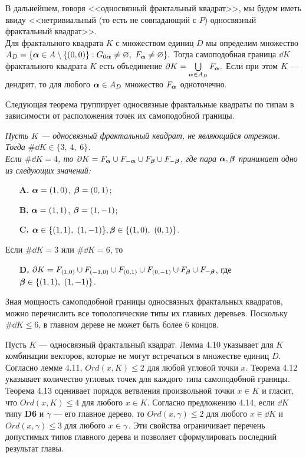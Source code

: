 \documentclass[a5paper,9pt,twoside]{extarticle} %
\begin{document}
В дальнейшем, говоря <<односвязный фрактальный квадрат>>, мы будем иметь ввиду <<нетривиальный (то есть не совпадающий с $P$) односвязный фрактальный квадрат>>.\\

Для фрактального квадрата $K$ с множеством единиц $D$ мы определим множество
$A_D=\{{\bm{\alpha}}\in A\setminus\{(0,0)\}: G_{0{\bm{\alpha}}}\neq\varnothing,\ F_{\bm{\alpha}}\neq\varnothing\}.$
Тогда самоподобная граница $\dd K$ фрактального квадрата $K$ есть объединение
$\partial K=\bigcup\limits_{{\bm{\alpha}}\in A_D}F_{\bm{\alpha}}.$
Если при этом $K$ --- дендрит, то для любого ${\bm{\alpha}}\in A_D$ множество $F_{\bm{\alpha}}$ одноточечно.

Следующая теорема группирует односвязные фрактальные квадраты по типам в зависимости от расположения точек их самоподобной границы.\\

{\em Пусть $K$ --- односвязный фрактальный квадрат, не являющийся отрезком.
Тогда $\#\dd K\in\{3,\ 4,\ 6\}$. \\
Если $\#\dd K=4$, то $\partial K=F_{\bm{\alpha}}\cup F_{-{\bm{\alpha}}}\cup F_{\bm{\beta}}\cup F_{-{\bm{\beta}}}$, где пара ${\bm{\alpha}},{\bm{\beta}}$ принимает одно из следующих значений:
\begin{itemize}[nolistsep]
\item[{\bf A.}] ${\bm{\alpha}}=(1,0)$, $ {\bm{\beta}}=(0,1)$;
\item[{\bf B.}] ${\bm{\alpha}}=(1,1)$, $ {\bm{\beta}}=(1,-1)$;
\item[{\bf C.}] $\bma\in\{(1,1),\ (1,-1)\},\bmb\in\{(1,0),\ (0,1)\}$.
\end{itemize}
Если $\#\dd K=3$ или $\#\dd K=6$, то
\begin{itemize}[nolistsep]
\item[{\bf D.}] $\partial K=F_{(1,0)}\cup F_{(-1,0)}\cup F_{(0,1)}\cup F_{(0,-1)}\cup F_{\bm{\beta}}\cup F_{-{\bm{\beta}}}$, где ${\bm{\beta}}\in\{(1,1),\ (1,-1)\}$.
\end{itemize}}

Зная мощность самоподобной границы односвязных фрактальных квадратов, можно перечислить все топологические типы их главных деревьев.
Поскольку $\#\dd K\leq6$, в главном дереве не может быть более 6 концов.

Пусть $K$ --- односвязный фрактальный квадрат.
Лемма 4.10 указывает для $K$ комбинации векторов, которые не могут встречаться в множестве единиц $D$.
Согласно лемме 4.11, $Ord(x,K)\leq 2$ для любой угловой точки $x$.
Теорема 4.12 указывает количество угловых точек для каждого типа самоподобной границы.
Теорема 4.13 оценивает порядок ветвления произвольной точки $x\in K$ и гласит, что $Ord(x,K)\leq 4$ для любого $x\in K$.
Согласно предложению 4.14, если $\dd K$ типу {\bf D6} и $\gamma$ --- его главное дерево, то $Ord(x,\gamma)\leq2$ для любого $x\in\dd K$ и $Ord(x,\gamma)\leq3$ для любого $x\in\gamma$.
Эти свойства ограничивает перечень допустимых типов главного дерева и позволяет сформулировать последний результат главы.\\
\end{document}
